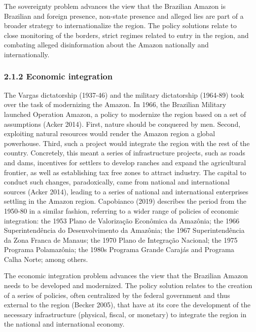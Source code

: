 \documentclass[
]{article}
\begin{document}
The sovereignty problem advances the view that the Brazilian Amazon is
Brazilian and foreign presence, non-state presence and alleged lies are
part of a broader strategy to internationalize the region. The policy
solutions relate to close monitoring of the borders, strict regimes
related to entry in the region, and combating alleged disinformation
about the Amazon nationally and internationally.

\hypertarget{economic-integration}{%
\subsubsection{2.1.2 Economic integration}\label{economic-integration}}

The Vargas dictatorship (1937-46) and the military dictatorship
(1964-89) took over the task of modernizing the Amazon. In 1966, the
Brazilian Military launched Operation Amazon, a policy to modernize the
region based on a set of assumptions (Acker 2014). First, nature should
be conquered by men. Second, exploiting natural resources would render
the Amazon region a global powerhouse. Third, such a project would
integrate the region with the rest of the country. Concretely, this
meant a series of infrastructure projects, such as roads and dams,
incentives for settlers to develop ranches and expand the agricultural
frontier, as well as establishing tax free zones to attract industry.
The capital to conduct such changes, paradoxically, came from national
and international sources (Acker 2014), leading to a series of national
and international enterprises settling in the Amazon region. Capobianco
(2019) describes the period from the 1950-80 in a similar fashion,
referring to a wider range of policies of economic integration: the 1953
Plano de Valorização Econômica da Amazônia; the 1966 Superintendência do
Desenvolvimento da Amazônia; the 1967 Superintendência da Zona Franca de
Manaus; the 1970 Plano de Integração Nacional; the 1975 Programa
Polamazônia; the 1980s Programa Grande Carajás and Programa Calha Norte;
among others.

The economic integration problem advances the view that the Brazilian
Amazon needs to be developed and modernized. The policy solution relates
to the creation of a series of policies, often centralized by the
federal government and thus external to the region (Becker 2005), that
have at its core the development of the necessary infrastructure
(physical, fiscal, or monetary) to integrate the region in the national
and international economy.
\end{document}
